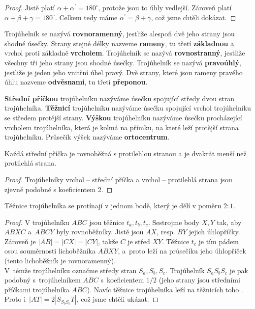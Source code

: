 \begin{proof}
  Jistě platí $\alpha + \alpha^\prime = 180^\circ$, protože jsou to úhly
  vedlejší. Zároveň platí $\alpha + \beta + \gamma = 180^\circ$. Celkem
  tedy máme $\alpha^\prime = \beta + \gamma$, což jsme chtěli dokázat.
\end{proof}

\begin{definition}
  Trojúhelník se nazývá \textbf{rovnoramenný}, jestliže alespoň dvě jeho strany jsou shodné úsečky. Strany stejné délky nazveme \textbf{rameny}, tu třetí \textbf{základnou} a vrchol proti základně \textbf{vrcholem}.
  Trojúhelník se nazývá \textbf{rovnostranný}, jestliže všechny tři jeho strany jsou shodné úsečky.
  Trojúhelník se nazývá \textbf{pravoúhlý}, jestliže je jeden jeho vnitřní úhel pravý. Dvě strany, které jsou rameny pravého úhlu nazveme \textbf{odvěsnami}, tu třetí \textbf{přeponou}.
\end{definition}

\begin{definition}
  \textbf{Střední příčkou} trojúhelníku nazýváme úsečku spojující středy dvou stran trojúhelníka.
  \textbf{Těžnicí} trojúhelníku nazýváme úsečku spojující vrchol trojúhelníku se středem protější strany.
  \textbf{Výškou} trojúhelníku nazýváme úsečku procházející vrcholem trojúhelníka, která je kolmá na přímku, na které leží protější strana trojúhelníku. Průsečík výšek nazýváme \textbf{ortocentrum}.
\end{definition}

\begin{veta}
  Každá střední příčka je rovnoběžná s protilehlou stranou a je dvakrát menší než protilehlá strana.
\end{veta}

\begin{proof}
  Trojúhelníky vrchol -- střední příčka a vrchol -- protilehlá strana jsou zjevně podobné s koeficientem 2.
\end{proof}

\begin{veta}
  Těžnice trojúhelníka se protínají v jednom bodě, který je dělí v poměru $2:1$.
\end{veta}

\begin{proof}
    V trojúhelníku $ABC$ jsou těžnice $t_a,t_b,t_c$. Sestrojme body $X,Y$ tak, aby
    $ABXC$ a~$ABCY$ byly rovnoběžníky. Jistě jsou $AX$, resp. $BY$ jejich úhlopříčky.
    Zároveň je $|AB|=|CX|=|CY|$, takže $C$ je střed $XY$. Těžnice $t_c$ je tím pádem
    osou souměrnosti lichoběžníka $ABXY$, a~proto leží na průsečíku jeho úhlopříček
    (tento lichoběžník je rovnoramenný).\\
    V~témže trojúhelníku označme středy stran $S_a,S_b,S_c$. Trojúhelník $S_aS_bS_c$ je
    pak podobný s~trojúhelníkem $ABC$ s~koeficientem $1/2$ (jeho strany jsou středními
    příčkami trojúhelníka $ABC$). Navíc těžnice  trojúhelníka leží na
    těžnicích toho . Proto i~$|AT|=2|S_{S_bS_c}T|$, což jsme chtěli ukázat.
\end{proof}

